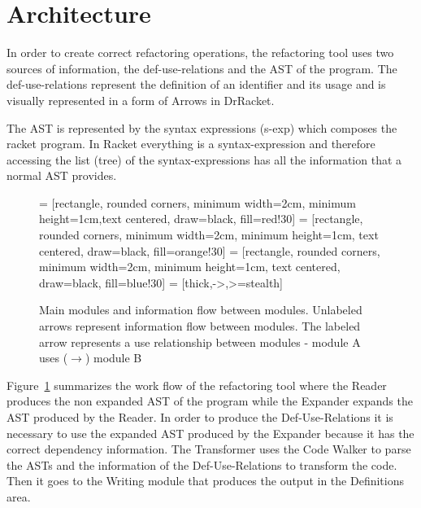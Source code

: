 \section{Architecture}



In order to create correct refactoring operations, the refactoring tool uses two sources of
information, the def-use-relations and the AST of the program.
The def-use-relations represent the definition of an identifier and its usage and is
 visually represented in a form of Arrows in DrRacket.

The AST is represented by the syntax expressions (s-exp) which composes the racket program.
In Racket everything is a syntax-expression and therefore accessing the list (tree)
of the syntax-expressions has all the information that a normal AST provides. %


\begin{figure}
\centering
{} = [rectangle, rounded corners, minimum width=2cm, minimum height=1cm,text centered, draw=black, fill=red!30] %
 = [rectangle, rounded corners, minimum width=2cm, minimum height=1cm, text centered, draw=black, fill=orange!30] %
 = [rectangle, rounded corners, minimum width=2cm, minimum height=1cm, text centered, draw=black, fill=blue!30]
 = [thick,->,>=stealth]
\caption{Main modules and information flow between modules. Unlabeled arrows represent information
flow between modules.
The labeled arrow represents a use relationship between modules - module A uses ($\rightarrow$) module B}
\label{flow-chart}
\end{figure}
Figure~\ref{flow-chart} summarizes the work flow of the refactoring tool where
the Reader produces the non expanded AST of the program while the Expander expands the
AST produced by the Reader.
In order to produce the Def-Use-Relations it is necessary to use the expanded AST produced by the
Expander because it has the correct dependency information.
The Transformer uses the Code Walker to parse the ASTs and the information of the Def-Use-Relations
to transform the code. Then it goes to the Writing module that produces the output
in the Definitions area.


